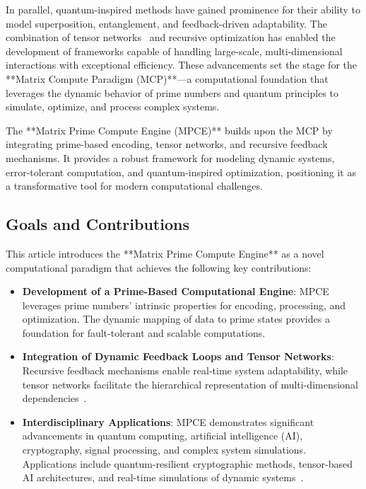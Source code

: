 \documentclass{article}
\theoremstyle{plain}
\begin{document}
In parallel, quantum-inspired methods have gained prominence for their ability to model superposition, entanglement, and feedback-driven adaptability. The combination of tensor networks~\cite{white1992tensor, vidal2003efficient} and recursive optimization has enabled the development of frameworks capable of handling large-scale, multi-dimensional interactions with exceptional efficiency. These advancements set the stage for the **Matrix Compute Paradigm (MCP)**---a computational foundation that leverages the dynamic behavior of prime numbers and quantum principles to simulate, optimize, and process complex systems.

The **Matrix Prime Compute Engine (MPCE)** builds upon the MCP by integrating prime-based encoding, tensor networks, and recursive feedback mechanisms. It provides a robust framework for modeling dynamic systems, error-tolerant computation, and quantum-inspired optimization, positioning it as a transformative tool for modern computational challenges.

\subsection{Goals and Contributions}

This article introduces the **Matrix Prime Compute Engine** as a novel computational paradigm that achieves the following key contributions:

\begin{itemize}
    \item \textbf{Development of a Prime-Based Computational Engine}: MPCE leverages prime numbers' intrinsic properties for encoding, processing, and optimization. The dynamic mapping of data to prime states provides a foundation for fault-tolerant and scalable computations.
    \item \textbf{Integration of Dynamic Feedback Loops and Tensor Networks}: Recursive feedback mechanisms enable real-time system adaptability, while tensor networks facilitate the hierarchical representation of multi-dimensional dependencies~\cite{white1992tensor}.
    \item \textbf{Interdisciplinary Applications}: MPCE demonstrates significant advancements in quantum computing, artificial intelligence (AI), cryptography, signal processing, and complex system simulations. Applications include quantum-resilient cryptographic methods, tensor-based AI architectures, and real-time simulations of dynamic systems~\cite{grover1996fast, wang2021quantum}.
\end{itemize}
\end{document}
